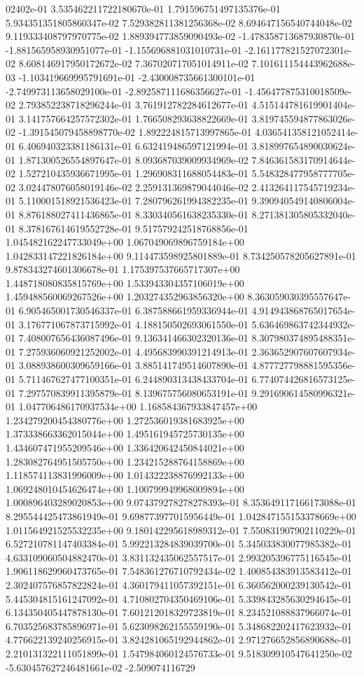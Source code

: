 02402e-01	3.535462211722180670e-01	1.791596751497135376e-01	5.934351351805860347e-02	7.529382811381256368e-02	8.694647156540744048e-02	9.119333408797970775e-02	1.889394773859090493e-02	-1.478358713687930870e-01	-1.881565958930951077e-01	-1.155696881031010731e-01	-2.161177821527072301e-02	8.608146917950172672e-02	7.367020717051014911e-02	7.101611154443962688e-03	-1.103419669995791691e-01	-2.430008735661300101e-01	-2.749973113658029100e-01	-2.892587111686356627e-01	-1.456477875310018509e-02	2.793852238718296244e-01	3.761912782284612677e-01	4.515144781619901404e-01	3.141757664257572302e-01	1.766508293638822669e-01	3.819745594877863026e-02	-1.391545079458898770e-02	1.892224815713997865e-01	4.036541358121052414e-01	6.406940323381186131e-01	6.632419486597121994e-01	3.818997654890030624e-01	1.871300526554897647e-01	8.093687039009934969e-02	7.846361583170914644e-02	1.527210435936671995e-01	1.296908311688054483e-01	5.548328477958777705e-02	3.024478076058019146e-02	2.259131369879044046e-02	2.413264117545719234e-01	5.110001518921536423e-01	7.280796261994382235e-01	9.390940549140806004e-01	8.876188027411436865e-01	8.330340561638235330e-01	8.271381305805332040e-01	8.378167614619552728e-01	9.517579242518768856e-01	1.045482162247733049e+00	1.067049069896759184e+00	1.042833147221826184e+00	9.114473598925801889e-01	8.734250578205627891e-01	9.878343274601306678e-01	1.175397537665717307e+00	1.448718080835815769e+00	1.533943304357106019e+00	1.459488560069267526e+00	1.203274352963856320e+00	8.363059030395557647e-01	6.905465001730546337e-01	6.387588661959336944e-01	4.914943868765017654e-01	3.176771067873715992e-01	4.188150502693061550e-01	5.636469863742344932e-01	7.408007656436087496e-01	9.136341466302320136e-01	8.307980374895488351e-01	7.275936060921252002e-01	4.495683990391214913e-01	2.363652907607607934e-01	3.088938600309659166e-01	3.885141749514607890e-01	4.877727798881595356e-01	5.711467627477100351e-01	6.244890313438433704e-01	6.774074426816573125e-01	7.297570839911395879e-01	8.139675756080653191e-01	9.291690614580996321e-01	1.047706486170937534e+00	1.168584367933847457e+00	1.234279200454380776e+00	1.272536019381683925e+00	1.373338663362015044e+00	1.495161945725730135e+00	1.434607471955209546e+00	1.336420642450844021e+00	1.283082764951505750e+00	1.234215288764158869e+00	1.118574113831996009e+00	1.014322238876992133e+00	1.069248010454626474e+00	1.100799949968009894e+00	1.000896403289020853e+00	9.074379278278278393e-01	8.353649117166173088e-01	8.295544425473861949e-01	9.698773977015956449e-01	1.042847155153378669e+00	1.011564921525532235e+00	9.180142295618989312e-01	7.550831907902110229e-01	6.527210781147403384e-01	5.992213284839039700e-01	5.345033830077985382e-01	4.633109060504882470e-01	3.831132435062557517e-01	2.993205396775116545e-01	1.906118629960473765e-01	7.548361276710792434e-02	1.400854383913583412e-01	2.302407576857822824e-01	4.360179411057392151e-01	6.360562000239130542e-01	5.445304815161247092e-01	4.710802704350469106e-01	5.339843285630294645e-01	6.134350405447878130e-01	7.601212018329723819e-01	8.234521088837966074e-01	6.703525683785896971e-01	5.623098262155559190e-01	5.348682202417623932e-01	4.776622139240256915e-01	3.824281065192944862e-01	2.971276652856890688e-01	2.210131322111051899e-01	1.547984060124576733e-01	9.518309910547641250e-02	-5.630457627246481661e-02	-2.509074116729